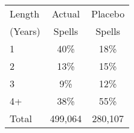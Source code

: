 \begin{tabular}{lcc}
\toprule
Length & Actual & Placebo \\
(Years) & Spells & Spells \\
\midrule
1 & 40\% & 18\% \\
2 & 13\% & 15\% \\
3 & 9\% & 12\% \\
4+ & 38\% & 55\% \\
Total &      499,064 &      280,107 \\
\bottomrule
\end{tabular}
